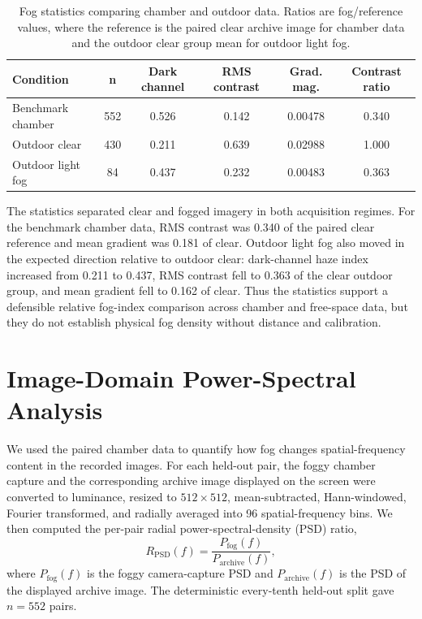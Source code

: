 \documentclass[9pt]{osa-supplemental-document}
\begin{document}
\begin{table}[htbp]
\centering
\small
\caption{Fog statistics comparing chamber and outdoor data. Ratios are fog/reference values, where the reference is the paired clear archive image for chamber data and the outdoor clear group mean for outdoor light fog.}
\label{tabS:fog_density_proxy}
\begin{tabular}{lccccc}
\toprule
\textbf{Condition} & \textbf{n} & \textbf{Dark channel} & \textbf{RMS contrast} & \textbf{Grad. mag.} & \textbf{Contrast ratio} \\
\midrule
Benchmark chamber & 552 & 0.526 & 0.142 & 0.00478 & 0.340 \\
Outdoor clear & 430 & 0.211 & 0.639 & 0.02988 & 1.000 \\
Outdoor light fog & 84 & 0.437 & 0.232 & 0.00483 & 0.363 \\
\bottomrule
\end{tabular}
\end{table}

The statistics separated clear and fogged imagery in both acquisition regimes. For the benchmark chamber data, RMS contrast was 0.340 of the paired clear reference and mean gradient was 0.181 of clear. Outdoor light fog also moved in the expected direction relative to outdoor clear: dark-channel haze index increased from 0.211 to 0.437, RMS contrast fell to 0.363 of the clear outdoor group, and mean gradient fell to 0.162 of clear. Thus the statistics support a defensible relative fog-index comparison across chamber and free-space data, but they do not establish physical fog density without distance and calibration.

\section{Image-Domain Power-Spectral Analysis}
\label{secS:psd_image_domain}

We used the paired chamber data to quantify how fog changes spatial-frequency content in the recorded images. For each held-out pair, the foggy chamber capture and the corresponding archive image displayed on the screen were converted to luminance, resized to $512 \times 512$, mean-subtracted, Hann-windowed, Fourier transformed, and radially averaged into 96 spatial-frequency bins. We then computed the per-pair radial power-spectral-density (PSD) ratio,
\begin{equation}
R_{\mathrm{PSD}}(f) =
\frac{P_{\mathrm{fog}}(f)}
     {P_{\mathrm{archive}}(f)} ,
\label{eqS:psd_ratio}
\end{equation}
where $P_{\mathrm{fog}}(f)$ is the foggy camera-capture PSD and $P_{\mathrm{archive}}(f)$ is the PSD of the displayed archive image. The deterministic every-tenth held-out split gave $n=552$ pairs.
\end{document}
